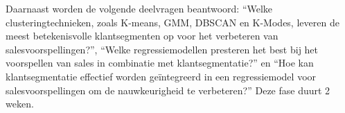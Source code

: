 \vspace{1 em}

Daarnaast worden de volgende deelvragen beantwoord: “Welke clusteringtechnieken, zoals K-means, GMM, DBSCAN en K-Modes, leveren de meest betekenisvolle klantsegmenten op voor het verbeteren van salesvoorspellingen?”, “Welke regressiemodellen presteren het best bij het voorspellen van sales in combinatie met klantsegmentatie?” en “Hoe kan klantsegmentatie effectief worden geïntegreerd in een regressiemodel voor salesvoorspellingen om de nauwkeurigheid te verbeteren?” Deze fase duurt 2 weken.
